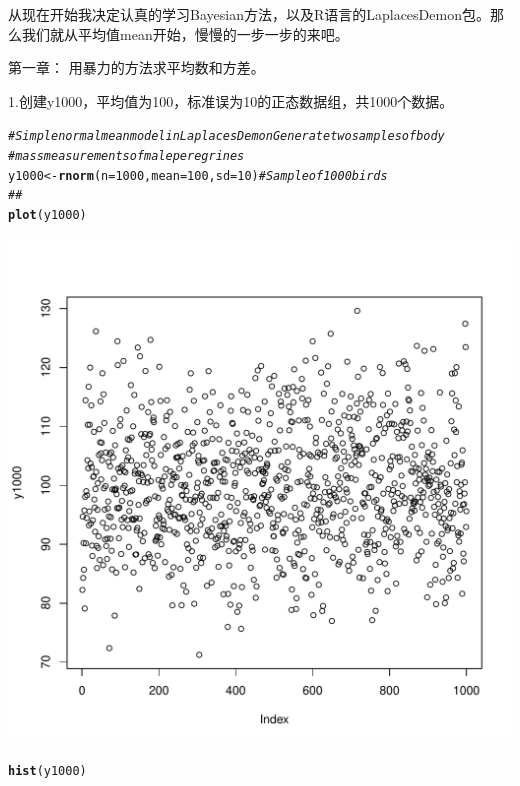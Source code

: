 \documentclass{article}\usepackage[]{graphicx}\usepackage[]{color}
\makeatletter
\def\maxwidth{ %
  \ifdim\Gin@nat@width>\linewidth
    \linewidth
  \else
    \Gin@nat@width
  \fi
}
\newcommand{\hlnum}[1]{\textcolor[rgb]{0.686,0.059,0.569}{#1}}%
\newcommand{\hlcom}[1]{\textcolor[rgb]{0.678,0.584,0.686}{\textit{#1}}}%
\newcommand{\hlstd}[1]{\textcolor[rgb]{0.345,0.345,0.345}{#1}}%
\newcommand{\hlkwb}[1]{\textcolor[rgb]{0.69,0.353,0.396}{#1}}%
\newcommand{\hlkwc}[1]{\textcolor[rgb]{0.333,0.667,0.333}{#1}}%
\newcommand{\hlkwd}[1]{\textcolor[rgb]{0.737,0.353,0.396}{\textbf{#1}}}%
\newenvironment{kframe}{%
 \def\at@end@of@kframe{}%
 \ifinner\ifhmode%
  \def\at@end@of@kframe{\end{minipage}}%
  \begin{minipage}{\columnwidth}%
 \fi\fi%
 \def\FrameCommand##1{\hskip\@totalleftmargin \hskip-\fboxsep
 \colorbox{shadecolor}{##1}\hskip-\fboxsep
     \hskip-\linewidth \hskip-\@totalleftmargin \hskip\columnwidth}%
 \MakeFramed {\advance\hsize-\width
   \@totalleftmargin\z@ \linewidth\hsize
   \@setminipage}}%
 {\par\unskip\endMakeFramed%
 \at@end@of@kframe}
\newenvironment{knitrout}{}{} %
\makeatother
\begin{document}
从现在开始我决定认真的学习Bayesian方法，以及R语言的LaplacesDemon包。那么我们就从平均值mean开始，慢慢的一步一步的来吧。

第一章： 用暴力的方法求平均数和方差。

1.创建y1000，平均值为100，标准误为10的正态数据组，共1000个数据。
\begin{knitrout}
\color{fgcolor}\begin{kframe}
\begin{alltt}
\hlcom{# Simple normal mean model in LaplacesDemon Generate two samples of body}
\hlcom{# mass measurements of male peregrines}
\hlstd{y1000} \hlkwb{<-} \hlkwd{rnorm}\hlstd{(}\hlkwc{n} \hlstd{=} \hlnum{1000}\hlstd{,} \hlkwc{mean} \hlstd{=} \hlnum{100}\hlstd{,} \hlkwc{sd} \hlstd{=} \hlnum{10}\hlstd{)}  \hlcom{# Sample of 1000 birds}
\hlcom{## }
\hlkwd{plot}\hlstd{(y1000)}
\end{alltt}
\end{kframe}
\includegraphics[width=\maxwidth]{figure/unnamed-chunk-11} 
\begin{kframe}\begin{alltt}
\hlkwd{hist}\hlstd{(y1000)}
\end{alltt}
\end{kframe}

\end{knitrout}
\end{document}
